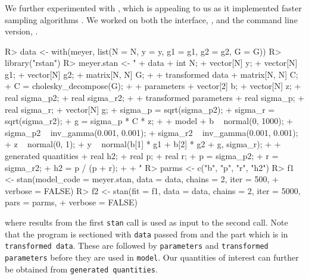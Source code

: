 \documentclass[article]{jss}
\begin{document}
\subsubsection[Stan]{}
We further experimented with , which is appealing to us as it
implemented faster sampling algorithms \citep[p.~307]{gelman14}. We worked
on both the  interface,  \citep{rstan}, and the command
line version,  \citep{cmdstan}.
%
\begin{Schunk}
\begin{Sinput}
R> data <- with(meyer, list(N = N, y = y, g1 = g1, g2 = g2, G = G))
R> library("rstan")
R> meyer.stan <- "
+  data {
+    int N;
+    vector[N] y;
+    vector[N] g1;
+    vector[N] g2;
+    matrix[N, N] G;
+  }
+  transformed data {
+    matrix[N, N] C;
+    C = cholesky_decompose(G);
+  }
+  parameters {
+    vector[2] b;
+    vector[N] z;
+    real sigma_p2;
+    real sigma_r2;
+  }
+  transformed parameters {
+    real sigma_p;
+    real sigma_r;
+    vector[N] g;
+    sigma_p = sqrt(sigma_p2);
+    sigma_r = sqrt(sigma_r2);
+    g = sigma_p * C * z;
+  }
+  model {
+    b ~ normal(0, 1000);
+    sigma_p2 ~ inv_gamma(0.001, 0.001);
+    sigma_r2 ~ inv_gamma(0.001, 0.001);
+    z ~ normal(0, 1);
+    y ~ normal(b[1] * g1 + b[2] * g2 + g, sigma_r);
+  }
+  generated quantities {
+    real h2;
+    real p;
+    real r;
+    p = sigma_p2;
+    r = sigma_r2;
+    h2 = p / (p + r);
+  }
+  "
R> parms <- c("b", "p", "r", "h2")
R> f1 <- stan(model_code = meyer.stan, data = data, chains = 2, iter = 500, 
+    verbose = FALSE)
R> f2 <- stan(fit = f1, data = data, chains = 2, iter = 5000, pars = parms,
+    verbose = FALSE)
\end{Sinput}
\end{Schunk}
%
where results from the first \verb/stan/ call is used as input to the
second call. Note that the program is sectioned with \verb/data/
passed from  and the part which is in
\verb/transformed data/. These are followed by \verb/parameters/ and
\verb/transformed parameters/ before they are used in
\verb/model/. Our quantities of interest can further be obtained from
\verb/generated quantities/.
\end{document}
